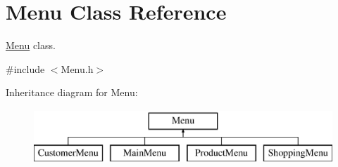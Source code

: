 \hypertarget{classMenu}{}\section{Menu Class Reference}
\label{classMenu}


\hyperlink{classMenu}{Menu} class.  




{\ttfamily \#include $<$Menu.\+h$>$}

Inheritance diagram for Menu\+:\begin{figure}[H]
\begin{center}
\leavevmode
\includegraphics[height=2.000000cm]{classMenu}
\end{center}
\end{figure}
